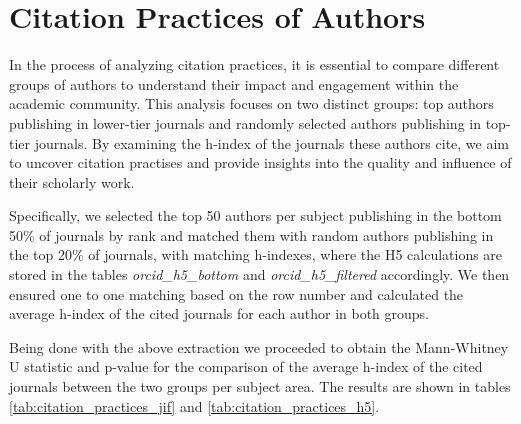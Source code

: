 \section{Citation Practices of Authors}

In the process of analyzing citation practices, it is essential to compare
different groups of authors to understand their impact and engagement within
the academic community. This analysis focuses on two distinct groups: top
authors publishing in lower-tier journals and randomly selected authors
publishing in top-tier journals. By examining the h-index of the journals these
authors cite, we aim to uncover citation practises and provide insights into
the quality and influence of their scholarly work.

Specifically, we selected the top 50 authors per subject publishing in the
bottom 50\% of journals by rank and matched them with random authors publishing
in the top 20\% of journals, with matching h-indexes, where the H5 calculations
are stored in the tables \emph{orcid\_h5\_bottom} and
\emph{orcid\_h5\_filtered} accordingly. We then ensured one to one matching
based on the row number and calculated the average h-index of the cited
journals for each author in both groups.

Being done with the above extraction we proceeded to obtain the Mann-Whitney U
statistic and p-value for the comparison of the average h-index of the cited
journals between the two groups per subject area. The results are shown in
tables \ref{tab:citation_practices_jif} and \ref{tab:citation_practices_h5}.

